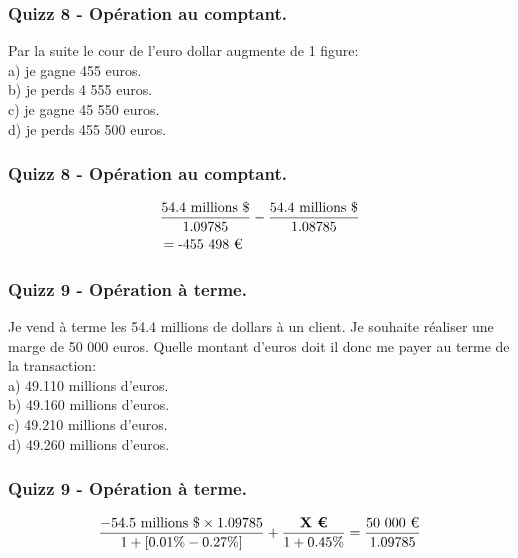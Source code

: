 \documentclass{beamer}
\begin{document}
\begin{frame}
\frametitle{Quizz 8 - Opération au comptant.}
Par la suite le cour de l'euro dollar augmente de 1 figure: \\
\vspace{0.5cm}
a) je gagne 455 euros. \\
b) je perds 4 555 euros.  \\
c) je gagne 45 550 euros. \\
d) je perds 455 500 euros.  \\
\vspace{0.5cm}
\end{frame}


\begin{frame}
\frametitle{Quizz 8 - Opération au comptant.}
\huge
\[
\begin{split}
&\frac{\text{54.4 millions \$}}{1.09785}-\frac{\text{54.4 millions \$}}{1.08785}\\
&=\text{-455 498 \texteuro}\\
\end{split}
\]
\end{frame}


\begin{frame}
\frametitle{Quizz 9 - Opération à terme.}
Je vend à terme les 54.4 millions de dollars à un client. Je souhaite réaliser une marge de 50 000 euros. Quelle montant d'euros doit il donc me payer au terme de la transaction:\\
\vspace{0.5cm}
a) 49.110 millions d'euros. \\
b) 49.160 millions d'euros. \\
c) 49.210 millions d'euros. \\
d) 49.260 millions d'euros.\\
\vspace{0.5cm}
\end{frame}


\begin{frame}
\frametitle{Quizz 9 - Opération à terme.}
\Large
\[
\frac{-54.5 \text{ millions } \$ \times 1.09785}{1+[0.01\%-0.27\%]}+\frac{\textbf{X \texteuro} }{1+0.45\%}=\frac{\text{50 000 \texteuro} }{1.09785}
\]
\end{frame}
\end{document}
